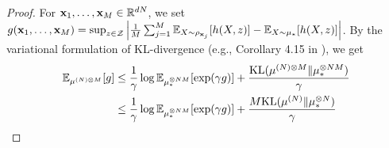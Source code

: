 \begin{proof}
    For $\mathbf{x}_1,\ldots,\mathbf{x}_M \in \mathbb{R}^{dN}$, we set 
    $g(\mathbf{x}_1,\ldots,\mathbf{x}_M) = \sup_{z \in \mathcal{Z}} 
    \left| \frac{1}{M}\sum_{j=1}^M \mathbb{E}_{X\sim \rho_{\mathbf{x}_j}}[h(X,z)] - \mathbb{E}_{X\sim \mu_*}[h(X,z)]\right|$.
    By the variational formulation of KL-divergence (e.g., Corollary 4.15 in \citet{boucheron2013concentration}), we get
    \begin{align}\label{eq:variational_kl}
        \mathbb{E}_{\mu^{(N)\otimes M}}[g]
        &\leq \frac{1}{\gamma} \log \mathbb{E}_{\mu^{\otimes N M}_*}[\exp(\gamma g)] + \frac{\mathrm{KL}(\mu^{(N)\otimes M}\|\mu^{\otimes N M}_*)}{\gamma} \notag \\
        &\leq \frac{1}{\gamma} \log \mathbb{E}_{\mu^{\otimes N M}_*}[\exp(\gamma g)] + \frac{M\mathrm{KL}(\mu^{(N)}\|\mu^{\otimes N}_*)}{\gamma} 
    \end{align}


\end{proof}
